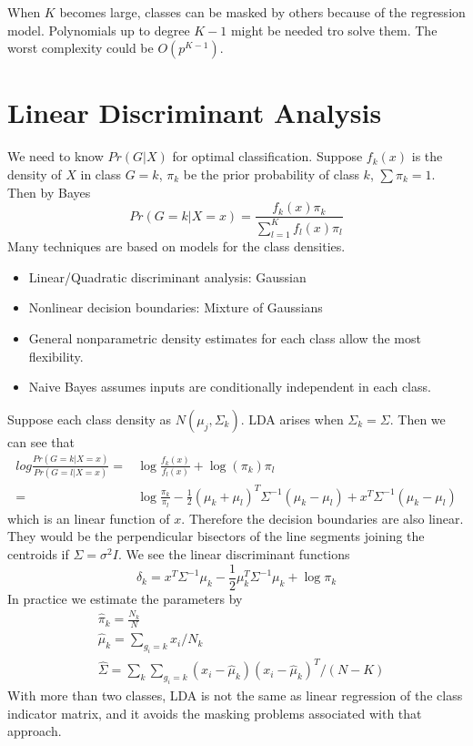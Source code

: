 When $K$ becomes large, classes can be masked by others because of the regression model. 
Polynomials up to degree $K-1$ might be needed tro solve them. The worst complexity 
could be $O(p^{K-1})$. 

\section{Linear Discriminant Analysis}
We need to know $Pr(G|X)$ for optimal classification. Suppose $f_k(x)$ is the density
of $X$ in class $G=k$, $\pi_k$ be the prior probability of class $k$, $\sum \pi_k=1$. 
Then by Bayes
\begin{equation*}
Pr(G=k|X=x)=\frac{f_k(x)\pi_k}{\sum_{l=1}^Kf_l(x)\pi_l}
\end{equation*}
Many techniques are based on models for the class densities. 
\begin{itemize}
\item Linear/Quadratic discriminant analysis: Gaussian
\item Nonlinear decision boundaries: Mixture of Gaussians
\item General nonparametric density estimates for each class allow the most flexibility. 
\item Naive Bayes assumes inputs are conditionally independent in each class. 
\end{itemize}
Suppose each class density as $N(\mu_j,\Sigma_k)$. LDA arises when $\Sigma_k=\Sigma$. 
Then we can see that
\begin{align*}
log\frac{Pr(G=k|X=x)}{Pr(G=l|X=x)}=&\log\frac{f_k(x)}{f_l(x)}+\log(\pi_k){\pi_l}\\
=&\log\frac{\pi_k}{\pi_l}-\frac{1}{2}(\mu_k+\mu_l)^T\Sigma^{-1}(\mu_k-\mu_l)+
x^T\Sigma^{-1}(\mu_k-\mu_l)
\end{align*}
which is an linear function of $x$. Therefore the decision boundaries are also linear. 
They would be the perpendicular bisectors of the line segments joining the centroids
if $\Sigma=\sigma^2I$. We see the linear discriminant functions
\begin{equation*}
\delta_k=x^T\Sigma^{-1}\mu_k-\frac{1}{2}\mu_k^T\Sigma^{-1}\mu_k+\log \pi_k
\end{equation*}
In practice we estimate the parameters by
\begin{align*}
&\hat{\pi}_k=\frac{N_k}{N}\\
&\hat{\mu}_k=\sum_{g_i=k}x_i/N_k\\
&\hat{\Sigma}=\sum_{k}\sum_{g_i=k}(x_i-\hat{\mu}_k)(x_i-\hat{\mu}_k)^T/(N-K)
\end{align*}
With more than two classes, LDA is not the same as linear regression of
the class indicator matrix, and it avoids the masking problems associated
with that approach. 

